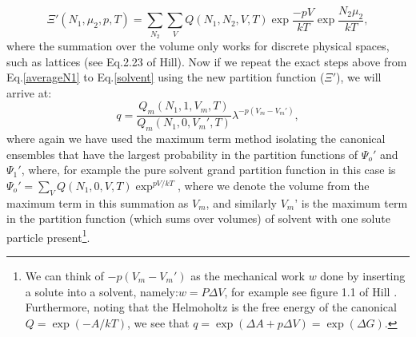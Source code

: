 \begin{equation}
\Xi'(N_1, \mu_2,p,T) = \sum_{N_2} \sum_{V} Q(N_1, N_2,V,T)\exp{\frac{-pV}{kT}} \exp{\frac{N_2 \mu_{2}}{kT}},
\end{equation}
where the summation over the volume only works for discrete physical spaces, such as lattices (see Eq.2.23 of Hill\cite{hill}).  Now if we repeat the exact steps above from Eq.\ref{averageN1} to Eq.\ref{solvent} using the new partition function ($\Xi'$), we will arrive at:
\begin{equation}\label{q2}
q = \frac{Q_m(N_1,1,V_m,T)}{Q_m(N_1,0,V_m',T)}\lambda^{-p(V_m - V_m')},
\end{equation}
where again we have used the maximum term method isolating the canonical ensembles that have the largest probability in the partition functions of $\Psi_o'$ and $\Psi_1'$, where, for example the pure solvent grand partition function in this case is $\Psi_o'=\sum_{V} Q(N_1,0,V,T)\exp^{pV/kT}$, where we denote the volume from the maximum term in this summation as $V_m$, and similarly $V_m$' is the maximum term in the partition function (which sums over volumes) of solvent with one solute particle present\footnote{ We can think of $-p(V_m - V_m')$ as the mechanical work $w$ done by inserting a solute into a solvent, namely:$w= P \Delta V$, for example see figure 1.1 of Hill \cite{hill}.   Furthermore, noting that the Helmoholtz is the free energy of the canonical $Q=\exp{(-A/kT)}$, we see that $q=\exp{( \Delta A +p \Delta V  )} = \exp{(\Delta G)}$.}.  



